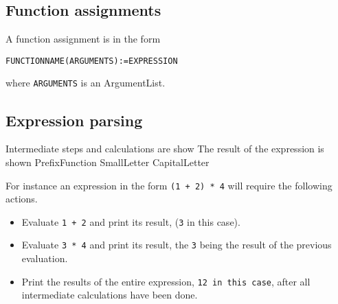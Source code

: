 \documentclass[11pt,a4paper]{article}
\begin{document}
\subsection{Function assignments}
A function assignment is in the form

\texttt{FUNCTIONNAME(ARGUMENTS):=EXPRESSION}

where \texttt{ARGUMENTS} is an ArgumentList.

\subsection{Expression parsing}
Intermediate steps and calculations are show
The result of the expression is shown
                         PrefixFunction SmallLetter CapitalLetter


For instance an expression in the form \texttt{(1 + 2) * 4} will require the following actions.

\begin{itemize}
\item Evaluate \texttt{1 + 2} and print its result, (\texttt{3} in this case).
\item Evaluate \texttt{3 * 4} and print its result, the \texttt{3} being the result of the previous evaluation.
\item Print the results of the entire expression, \texttt{12 in this case}, after all intermediate calculations have been done.
\end{itemize}
\end{document}
